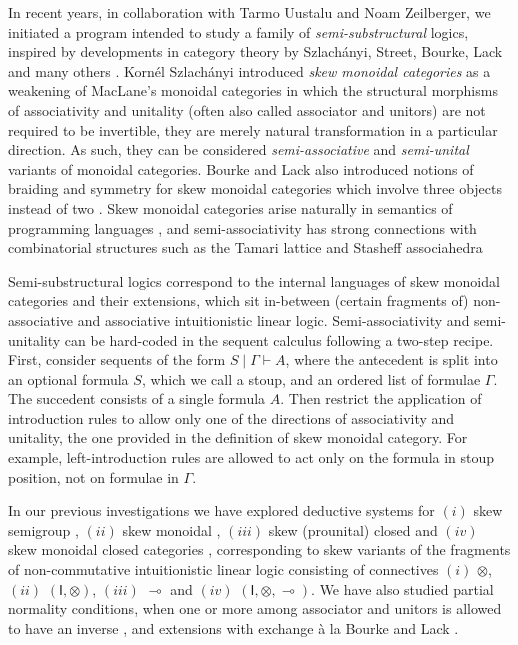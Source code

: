 \documentclass[submission,copyright,creativecommons]{eptcs}
\theoremstyle{definition}
\newcommand{\lolli}{\multimap}
\newcommand{\I}{\mathsf{I}}
\begin{document}
In recent years, in collaboration with Tarmo Uustalu and Noam Zeilberger, we initiated a program intended to study a family of \emph{semi-substructural} logics, inspired by developments in category theory by Szlach{\'a}nyi, Street, Bourke, Lack and many others \cite{szlachanyi:skew-monoidal:2012,lack:skew:2012,street:skew-closed:2013,lack:triangulations:2014,buckley:catalan:2015,bourke:skew:2017,bourke:skew:2018,bourke:lack:braided:2020}. Korn{\'e}l Szlach\'anyi introduced \emph{skew monoidal categories} as a weakening of MacLane's monoidal categories in which the structural morphisms of associativity and unitality (often also called associator and unitors) are not required to be invertible, they are merely natural transformation in a particular direction. As such, they can be considered \emph{semi-associative} and \emph{semi-unital} variants of monoidal categories. Bourke and Lack also introduced notions of braiding and symmetry for skew monoidal categories which involve three objects instead of two \cite{bourke:lack:braided:2020}. Skew monoidal categories arise naturally in semantics of programming languages \cite{altenkirch:monads:2014}, and semi-associativity has strong connections with combinatorial structures such as the Tamari lattice and Stasheff associahedra \cite{zeilberger:semiassociative:19,moortgat:tamari:20}

Semi-substructural logics correspond to the internal languages of skew monoidal categories and their extensions, which sit in-between (certain fragments of) non-associative and associative intuitionistic linear logic. Semi-associativity and semi-unitality can be hard-coded in the sequent calculus following a two-step recipe. First, consider sequents of the form $S \mid \Gamma \vdash A$, where the antecedent is split into an optional formula $S$, which we call a stoup, and an ordered list of formulae $\Gamma$. The succedent consists of a single formula $A$. Then restrict the application of introduction rules to allow only one of the directions of associativity and unitality, the one provided in the definition of skew monoidal category. For example, left-introduction rules are allowed to act only on the formula in stoup position, not on formulae in $\Gamma$.

In our previous investigations we have explored deductive systems for $(i)$ skew semigroup \cite{zeilberger:semiassociative:19}, $(ii)$ skew monoidal \cite{uustalu:sequent:2021}, $(iii)$ skew (prounital) closed \cite{uustalu:deductive:nodate} and $(iv)$ skew monoidal closed categories \cite{UVW:protsn}, corresponding to skew variants of the fragments of non-commutative intuitionistic linear logic consisting of connectives $(i)$ $\otimes$, $(ii)$ $(\I,\otimes)$, $(iii)$ $\lolli$ and $(iv)$ $(\I,\otimes,\lolli)$. We have also studied partial normality conditions, when one or more among associator and unitors is allowed to have an inverse \cite{uustalu:proof:nodate}, and extensions with exchange {\`a} la Bourke and Lack \cite{veltri:coherence:2021}.
\end{document}
